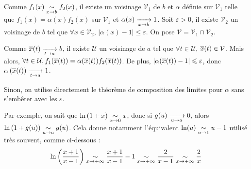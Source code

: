 \documentclass{magnolia}
\begin{document}
\begin{preuve}
Comme $\displaystyle f_1(x)\underset{x\rightarrow b}{\sim}f_2(x)$, il existe un voisinage $\mathcal{V}_1$ de $b$ et $\alpha$ définie sur $\mathcal{V}_1$ telle que $f_1(x)=\alpha(x)f_2(x)$ sur $\mathcal{V}_1$ et $\alpha(x)\xrightarrow[x\rightarrow b]{}1$. Soit $\varepsilon>0$, il existe $\mathcal{V}_2$ un voisinage de $b$ tel que $\forall x\in \mathcal{V}_2$, $|\alpha(x)-1|\leq \varepsilon$. On pose $\mathcal{V}=\mathcal{V}_1\cap\mathcal{V}_2$.

\smallskip
Comme $\displaystyle \overline{x}(t)\xrightarrow[t\rightarrow a]{}b$, il existe $\mathcal{U}$ un voisinage de $a$ tel que $\forall t \in \mathcal{U}$, $\overline{x}(t) \in \mathcal{V}$. Mais alors, $\forall t \in \mathcal{U}, f_1(\overline{x}(t))=\alpha(\overline{x}(t))f_2(\overline{x}(t))$. De plus, $|\alpha(\overline{x}(t))-1|\leqslant \varepsilon$, donc $\alpha\left(\overline{x}(t)\right)\xrightarrow[t\rightarrow a]{}1$.

Sinon, on utilise directement le théorème de composition des limites pour $\alpha$ sans s'embêter avec les $\varepsilon$.

\end{preuve}

\begin{victor}
\begin{remarqueUnique}
\remarque Par exemple, on sait que $\ln\left(1+x\right)\underset{x\rightarrow 0}{\sim}x$, donc si $g(u)\xrightarrow[u\rightarrow a]{}0$, alors $\ln\left(1+g(u)\right)\underset{u\rightarrow a}{\sim}g(u)$. Cela donne notamment l'équivalent $\ln(u)\underset{u\rightarrow 1}{\sim}u-1$ utilisé très souvent, comme ci-dessous :
$$\ln\left(\frac{x+1}{x-1}\right)\underset{x\rightarrow +\infty}{\sim}\frac{x+1}{x-1}-1\underset{x\rightarrow +\infty}{\sim}\frac{2}{x-1}\underset{x\rightarrow +\infty}{\sim}\frac{2}{x}$$
\end{remarqueUnique}
\end{victor}
\end{document}
